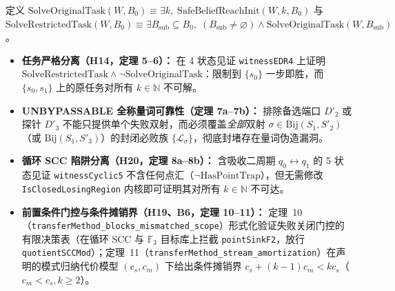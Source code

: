\documentclass[10pt,a4paper]{article}
\newcommand{\code}[1]{\nolinkurl{#1}}
\begin{document}
定义 $\mathrm{SolveOriginalTask}(W, B_0) \equiv \exists k,\; \mathrm{SafeBeliefReachInit}(W, k, B_0)$ 与 $\mathrm{SolveRestrictedTask}(W, B_0) \equiv \exists B_{\mathrm{sub}} \subseteq B_0,\; (B_{\mathrm{sub}} \ne \varnothing) \land \mathrm{SolveOriginalTask}(W, B_{\mathrm{sub}})$。
\begin{itemize}
\item \textbf{任务严格分离（H14，定理 5--6）：} 在 4 状态见证 \code{witnessEDR4} 上证明 $\mathrm{SolveRestrictedTask} \land \neg\mathrm{SolveOriginalTask}$：限制到 $\{s_0\}$ 一步即胜，而 $\{s_0, s_1\}$ 上的原任务对所有 $k \in \mathbb{N}$ 不可解。
\item \textbf{UNBYPASSABLE 全称量词可靠性（定理 7a--7b）：} 排除备选端口 $D'_2$ 或探针 $D'_3$ 不能只提供单个失败双射，而必须覆盖\emph{全部}双射 $\sigma \in \mathrm{Bij}(S_1, S'_2)$（或 $\mathrm{Bij}(S_1, S'_3)$）的封闭必败族 $\{\mathcal{L}_\sigma\}$，彻底封堵存在量词伪造漏洞。
\item \textbf{循环 SCC 陷阱分离（H20，定理 8a--8b）：} 含吸收二周期 $q_0 \leftrightarrow q_1$ 的 5 状态见证 \code{witnessCyclic5} 不含任何点汇（$\neg\mathrm{HasPointTrap}$），但无需修改 \code{IsClosedLosingRegion} 内核即可证明其对所有 $k \in \mathbb{N}$ 不可达。
\item \textbf{前置条件门控与条件摊销界（H19、B6，定理 10--11）：} 定理~10（\code{transferMethod_blocks_mismatched_scope}）形式化验证失败关闭门控的有限决策表（在循环 SCC 与 $\mathbb{F}_3$ 目标库上拦截 \code{pointSinkF2}，放行 \code{quotientSCCMod}）；定理~11（\code{transferMethod_stream_amortization}）在声明的模式归纳代价模型 $(c_s, c_m)$ 下给出条件摊销界 $c_s + (k-1)c_m < k c_s$（$c_m < c_s, k \ge 2$）。
\end{itemize}
\end{document}
